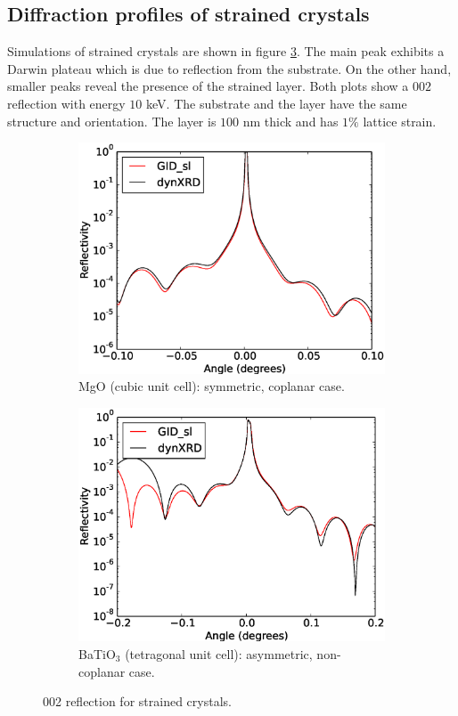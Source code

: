 \documentclass[12pt,oneside,notitlepage,abstracton,a4paper]{scrartcl}
\begin{document}
\newpage
\subsection{Diffraction profiles of strained crystals}\label{res2}

Simulations of strained crystals are shown in figure \ref{testsstrain}. The main peak exhibits a Darwin plateau which is due to reflection from the substrate. On the other hand, smaller peaks reveal the presence of the strained layer. Both plots show a $002$ reflection with energy $10$ keV. The substrate and the layer have the same structure and orientation. The layer is $100$ nm thick and has $1\%$ lattice strain.
\begin{figure}[h]
 \centering
 \begin{subfigure}[h]{0.49\textwidth}
  \includegraphics[width=\textwidth]{pics/test12.eps}
  \caption{MgO (cubic unit cell): symmetric, coplanar case.}\label{test12}
  \label{test12}
 \end{subfigure}
 \begin{subfigure}[h]{0.49\textwidth}
  \includegraphics[width=\textwidth]{pics/test14.eps}
  \caption{BaTiO$ _3$ (tetragonal unit cell): asymmetric, non-coplanar case.}\label{test14}
  \label{test14}
 \end{subfigure}
 \caption{002 reflection for strained crystals.}\label{testsstrain}
\end{figure}
\end{document}
